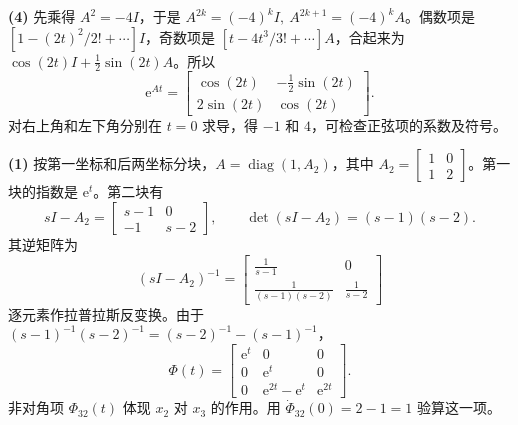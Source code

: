 \textbf{(4)} 先乘得 $A^2=-4I$，于是 $A^{2k}=(-4)^kI,\ A^{2k+1}=(-4)^k A$。偶数项是 $[1-(2t)^2/2!+\cdots]I$，奇数项是 $[t-4t^3/3!+\cdots]A$，合起来为 $\cos(2t)I+\tfrac12\sin(2t)A$。所以
\[
\mathrm e^{At}=\begin{bmatrix}
\cos(2t)&-\tfrac12\sin(2t)\\2\sin(2t)&\cos(2t)
\end{bmatrix}.
\]
对右上角和左下角分别在 $t=0$ 求导，得 $-1$ 和 $4$，可检查正弦项的系数及符号。



\sol \textbf{(1)} 按第一坐标和后两坐标分块，$A=\operatorname{diag}(1,A_2)$，其中 $A_2=\begin{bmatrix}1&0\\1&2\end{bmatrix}$。第一块的指数是 $\mathrm e^t$。第二块有
\[
sI-A_2=\begin{bmatrix}s-1&0\\-1&s-2\end{bmatrix},\qquad
\det(sI-A_2)=(s-1)(s-2).
\]
其逆矩阵为
\[
(sI-A_2)^{-1}
=\begin{bmatrix}
\frac{1}{s-1}&0\\[2pt]
\frac{1}{(s-1)(s-2)}&\frac{1}{s-2}
\end{bmatrix}
\]
逐元素作拉普拉斯反变换。由于 $(s-1)^{-1}(s-2)^{-1}=(s-2)^{-1}-(s-1)^{-1}$，
\[
\Phi(t)=\begin{bmatrix}
\mathrm e^t&0&0\\
0&\mathrm e^t&0\\
0&\mathrm e^{2t}-\mathrm e^t&\mathrm e^{2t}
\end{bmatrix}.
\]
非对角项 $\Phi_{32}(t)$ 体现 $x_2$ 对 $x_3$ 的作用。用 $\dot\Phi_{32}(0)=2-1=1$ 验算这一项。

